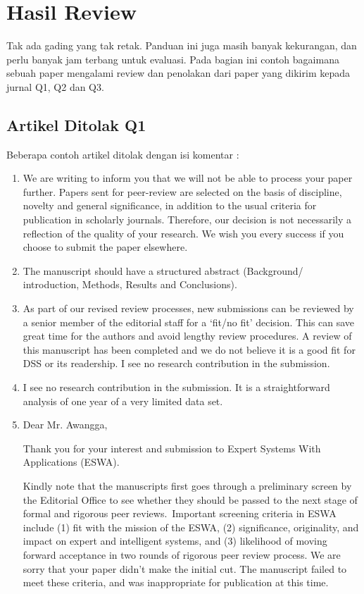 \chapter{Hasil Review}

Tak ada gading yang tak retak. Panduan ini juga masih banyak kekurangan, dan perlu banyak jam terbang untuk evaluasi. Pada bagian ini contoh bagaimana sebuah paper mengalami review dan penolakan dari paper yang dikirim kepada jurnal Q1, Q2 dan Q3. 

\section{Artikel Ditolak Q1}
Beberapa contoh artikel ditolak dengan isi komentar :
\begin{enumerate}
	\item We are writing to inform you that we will not be able to process your paper further. Papers sent for peer-review are selected on the basis of discipline, novelty and general significance, in addition to the usual criteria for publication in scholarly journals. Therefore, our decision is not necessarily a reflection of the quality of your research. We wish you every success if you choose to submit the paper elsewhere.
	\item The manuscript should have a structured abstract (Background/ introduction, Methods, Results and Conclusions).
	\item As part of our revised review processes, new submissions can be reviewed by a senior member of the editorial staff for a `fit/no fit' decision.  This can save great time for the authors and avoid lengthy review procedures.  A review of this manuscript has been completed and we do not believe it is a good fit for DSS or its readership.  I see no research contribution in the submission.
	\item I see no research contribution in the submission.  It is a straightforward analysis of one year of a very limited data set.
	\item Dear Mr. Awangga,

	Thank you for your interest and submission to Expert Systems With Applications (ESWA). 

	Kindly note that the  manuscripts first goes through a preliminary screen by the Editorial Office to see whether they should be passed to the next stage of formal and rigorous peer reviews.   Important screening criteria in ESWA include (1) fit with the mission of the ESWA, (2) significance, originality, and impact on expert and intelligent systems, and (3) likelihood of moving forward acceptance in two rounds of rigorous peer review process.  We are sorry that your paper didn't make the initial cut. The manuscript failed to meet these criteria, and was inappropriate for publication at this time.   


\end{enumerate}
